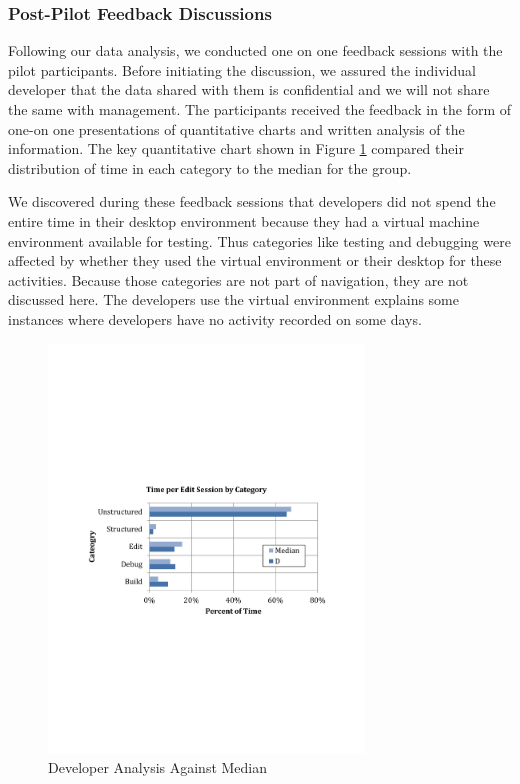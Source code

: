 \documentclass{sig-alternate}
\begin{document}
\subsubsection{Post-Pilot Feedback Discussions}

Following our data analysis, we conducted one on one feedback sessions with the pilot participants. Before initiating the discussion, we assured the individual developer that the data shared with them is confidential and we will not share the same with management. The participants received the feedback in the form of one-on one presentations of quantitative charts and written analysis of the information.  The key quantitative chart shown in Figure \ref{fig:developercomparison} compared their distribution of time in each category to the median for the group.   

We discovered during these feedback sessions that developers did not spend the entire time in their desktop environment because they had a virtual machine environment available for testing. Thus categories like testing and debugging were affected by whether they used the virtual environment or their desktop for these activities.  Because those categories are not part of navigation, they are not discussed here. The developers use the virtual environment  explains some instances where developers have no activity recorded on some days.  

\begin{figure}
	\includegraphics[width=3.3in]{developerEmedian.pdf}
	\caption{Developer Analysis Against Median}
	\label{fig:developercomparison}
\end{figure}
\end{document}
